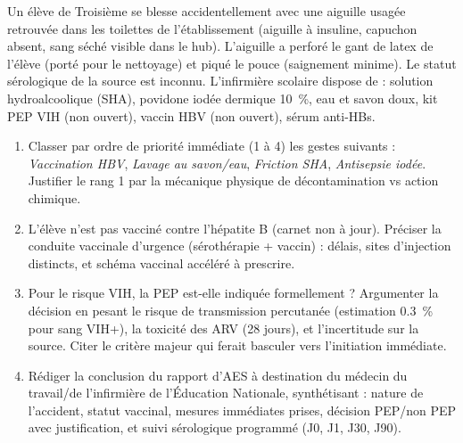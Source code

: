 \documentclass[11pt]{article}
\begin{document}
\begin{exercice}
Un élève de Troisième se blesse accidentellement avec une aiguille usagée retrouvée dans les toilettes de l'établissement (aiguille à insuline, capuchon absent, sang séché visible dans le hub). L'aiguille a perforé le gant de latex de l'élève (porté pour le nettoyage) et piqué le pouce (saignement minime). Le statut sérologique de la source est inconnu. L'infirmière scolaire dispose de : solution hydroalcoolique (SHA), povidone iodée dermique \SI{10}{\%}, eau et savon doux, kit PEP VIH (non ouvert), vaccin HBV (non ouvert), sérum anti-HBs.

\begin{enumerate}
    \item Classer par ordre de priorité immédiate (1 à 4) les gestes suivants : \textit{Vaccination HBV}, \textit{Lavage au savon/eau}, \textit{Friction SHA}, \textit{Antisepsie iodée}. Justifier le rang 1 par la mécanique physique de décontamination vs action chimique.
    \item L'élève n'est pas vacciné contre l'hépatite B (carnet non à jour). Préciser la conduite vaccinale d'urgence (sérothérapie + vaccin) : délais, sites d'injection distincts, et schéma vaccinal accéléré à prescrire.
    \item Pour le risque VIH, la PEP est-elle indiquée formellement ? Argumenter la décision en pesant le risque de transmission percutanée (estimation \SI{0,3}{\%} pour sang VIH+), la toxicité des ARV (28 jours), et l'incertitude sur la source. Citer le critère majeur qui ferait basculer vers l'initiation immédiate.
    \item Rédiger la conclusion du rapport d'AES à destination du médecin du travail/de l'infirmière de l'Éducation Nationale, synthétisant : nature de l'accident, statut vaccinal, mesures immédiates prises, décision PEP/non PEP avec justification, et suivi sérologique programmé (J0, J1, J30, J90).
\end{enumerate}
\end{exercice}
\end{document}
